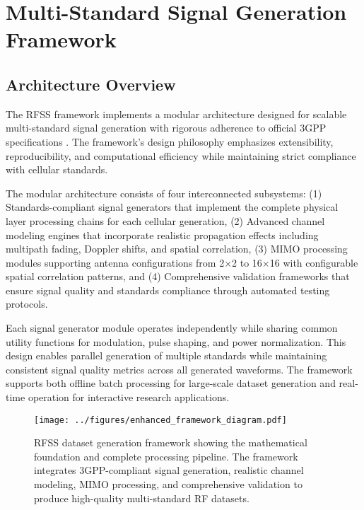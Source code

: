 \documentclass[twocolumn]{article}
\begin{document}
\section{Multi-Standard Signal Generation Framework}

\subsection{Architecture Overview}

The RFSS framework implements a modular architecture designed for scalable multi-standard signal generation with rigorous adherence to official 3GPP specifications \cite{3gpp2018ts45004,3gpp2018ts25211,3gpp2018ts36211,3gpp2020ts38211}. The framework's design philosophy emphasizes extensibility, reproducibility, and computational efficiency while maintaining strict compliance with cellular standards.

The modular architecture consists of four interconnected subsystems: (1) Standards-compliant signal generators that implement the complete physical layer processing chains for each cellular generation, (2) Advanced channel modeling engines that incorporate realistic propagation effects including multipath fading, Doppler shifts, and spatial correlation, (3) MIMO processing modules supporting antenna configurations from 2×2 to 16×16 with configurable spatial correlation patterns, and (4) Comprehensive validation frameworks that ensure signal quality and standards compliance through automated testing protocols.

Each signal generator module operates independently while sharing common utility functions for modulation, pulse shaping, and power normalization. This design enables parallel generation of multiple standards while maintaining consistent signal quality metrics across all generated waveforms. The framework supports both offline batch processing for large-scale dataset generation and real-time operation for interactive research applications. 

\begin{figure*}[t]
\centering
\texttt{[image: ../figures/enhanced\_framework\_diagram.pdf]}
\caption{RFSS dataset generation framework showing the mathematical foundation and complete processing pipeline. The framework integrates 3GPP-compliant signal generation, realistic channel modeling, MIMO processing, and comprehensive validation to produce high-quality multi-standard RF datasets.}
\label{fig:methodology}
\end{figure*}
\end{document}
